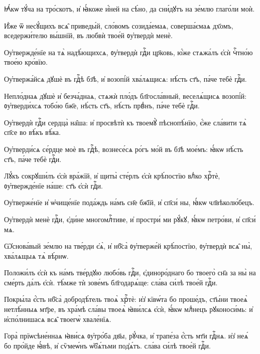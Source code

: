 \hKv Ꙗ҆́кѡ тꙋ́ча на тро́скотъ, и҆ ꙗ҆́коже и҆́ней на сѣ́но, да  сни́дꙋтъ на зе́млю глаго́ли моѝ. 
%

\hKv И҆́же ѿ несꙋ́щихъ всѧ̑ приведы́й, сло́вомъ созида́емаѧ,  соверша́ємаѧ дх҃омъ, вседержи́телю вы́шнїй, въ любвѝ  твое́й ᲂу҆твердѝ менѐ.  
%

\hKv Оу҆твержде́нїе на тѧ̀ надѣ́ющихсѧ,  ᲂу҆твердѝ гдⷭ҇и цр҃ковь, ю҆́же стѧжа́лъ є҆сѝ чⷭ҇тно́ю  твое́ю кро́вїю. 
%

\hKv Оу҆твержа́йсѧ дꙋшѐ въ гдⷭ҇ѣ бз҃ѣ, и҆ возопі́й  хва́лѧщисѧ: нѣ́сть ст҃ъ, па́че тебѐ гдⷭ҇и. 
%

\hKv Непло́днаѧ дꙋшѐ и҆ безча́днаѧ, стѧжѝ пло́дъ бл҃госла́вный,  веселѧ́щисѧ возопі́й: ᲂу҆тверди́хсѧ тобо́ю бж҃е, нѣ́сть  ст҃ъ, нѣ́сть првⷣнъ, па́че тебѐ гдⷭ҇и. 

\hKv Оу҆твердѝ гдⷭ҇и сердца̀ на̑ша: и҆ просвѣтѝ къ твоемꙋ̀  пѣснопѣ́нїю, є҆́же сла́вити тѧ̀ сп҃се во вѣ́къ вѣ́ка. 

\hKv Оу҆тверди́сѧ се́рдце моѐ въ гдⷭ҇ѣ, вознесе́сѧ ро́гъ мо́й  въ бз҃ѣ мое́мъ: ꙗ҆́кѡ нѣ́сть ст҃ъ, па́че тебѐ гдⷭ҇и. 

\hKv Лꙋ́къ сокрꙋши́лъ є҆сѝ вра́жїй, и҆ щиты̀ сте́рлъ є҆сѝ  крѣ́постїю влⷣко хрⷭ҇тѐ, ᲂу҆твержде́нїе на́ше: ст҃ъ  є҆сѝ гдⷭ҇и.  

\hKv Оу҆тверже́нїе и҆ ѡ҆чище́нїе пода́ждь на́мъ сн҃е бж҃їй, и҆  сп҃си́ ны, ꙗ҆́кѡ чл҃вѣколю́бецъ. 

\hKv Оу҆твердѝ менѐ гдⷭ҇и, є҆ди́не многомлⷭ҇тиве, и҆ простри́  ми рꙋ́кꙋ, ꙗ҆́кѡ петро́ви, и҆ сп҃си́ мѧ. 

\hKv Ѡ҆снова́вый зе́млю на тве́рди є҆ѧ̀, и҆ нб҃са̀ ᲂу҆тверже́й  крѣ́постїю, ᲂу҆твердѝ всѧ̑ ны̀, хва́лѧщыѧ тѧ̀ вѣ́рнѡ. 
%

\hKv Положи́лъ є҆сѝ къ на́мъ тве́рдꙋю любо́вь гдⷭ҇и,  є҆диноро́днаго бо твоего̀ сн҃а за ны̀ на сме́рть да́лъ  є҆сѝ. тѣ́мже тѝ зове́мъ бл҃годарѧ́ще: сла́ва си́лѣ  твое́й гдⷭ҇и. 
%

\hKv Покры́ла є҆́сть нб҃са̀ добродѣ́тель твоѧ̀  хрⷭ҇тѐ: и҆з̾ кївѡ́та бо проше́дъ, ст҃ы́ни твоеѧ̀  нетлѣ́нныѧ мт҃ре, въ хра́мѣ сла́вы твоеѧ̀ ꙗ҆ви́лсѧ  є҆сѝ, ꙗ҆́кѡ млⷣнецъ рꙋконоси́мь: и҆ и҆спо́лнишасѧ всѧ̑  твоегѡ̀ хвале́нїѧ.  

\hKv Гора̀ прїѡсѣне́ннаѧ ꙗ҆ви́сѧ ᲂу҆тро́ба дв҃ы, рꙋ́чка, и҆  трапе́за є҆́сть мт҃и гдⷭ҇нѧ. и҆з̾ неѧ́  бо про́йде ꙗ҆́вѣ, и҆ сѷмеѡ́нъ ѡ҆б̾ѧ́тьми  под̾ѧ́тъ. сла́ва си́лѣ твое́й гдⷭ҇и. 
%

